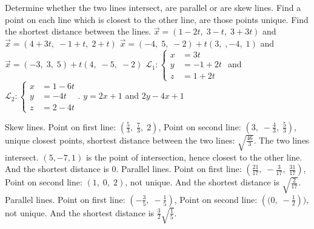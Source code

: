 
\begin{Exercise}[
name={},
title={}, 
difficulty=0,
origin={\cite{YL}}]
Determine whether the two lines intersect, are parallel or are skew lines.  Find a point on each line which is closest to the other line, are those points unique.  Find the shortest distance between the lines.
\Question $\vec{x}=(1-2t,\;3-t,\;3+3t)$ and $\vec{x}=(4+3t,\; -1+t,\; 2+t)$
\Question $\vec{x}=(-4,\;5,\;-2)+t(3,\;,-4,\; 1)$ and $\vec{x}=(-3,\; 3,\; 5)+t(4,\;-5,\;-2)$
\Question $\mathcal{L}_1: \left\{\begin{aligned} x&=3t\\y&=-1+2t\\z&=1+2t\end{aligned}\right.$ and 
$\mathcal{L}_2: \left\{\begin{aligned} x&=1-6t\\y&=-4t\\z&=2-4t\end{aligned}\right.$.
\Question $y=2x+1$ and $2y-4x+1$

\end{Exercise}
\begin{Answer}
\Question Skew lines. 
Point on first line: $\left(\frac{5}{3},\; \frac{7}{3},\; 2\right)$, Point on second line: $\left(3,\; -\frac{4}{3},\; \frac{5}{3}\right)$, unique closest points, shortest distance between the two lines: $\sqrt{\frac{46}{3}}$.
\Question The two lines intersect. $(5, -7, 1)$ is the point of intersection, hence closest to the other line.  And the shortest distance is $0$.
\Question Parallel lines. Point on first line: $\left(\frac{21}{17},\; -\frac{3}{17},\; \frac{31}{17}\right)$, Point on second line: $\left(1,\; 0,\; 2\right)$, not unique. And the shortest distance is $\sqrt{\frac{2}{17}}$.
\Question Parallel lines. 
Point on first line: $\left(-\frac{3}{5},\; -\frac{1}{5}\right)$, Point on second line: $\left((0,\; -\frac{1}{2}\right))$, not unique. And the shortest distance is $\frac{3}{2}\sqrt{\frac{1}{5}}$.
\end{Answer}
